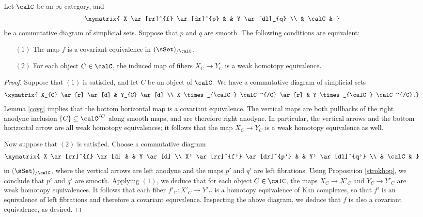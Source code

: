 \begin{proposition}\label{longwait44}
Let $\calC$ be an $\infty$-category, and
$$\xymatrix{ X \ar[rr]^{f} \ar[dr]^{p} & & Y \ar[dl]_{q} \\
& \calC & }$$ be a commutative diagram of simplicial sets. Suppose that
$p$ and $q$ are smooth. The following conditions are equivalent:
\begin{itemize}
\item[$(1)$] The map $f$ is a covariant equivalence in $(\sSet)_{/\calC}$.
\item[$(2)$] For each object $C \in \calC$, the induced map of fibers
$X_{C} \rightarrow Y_{C}$ is a weak homotopy equivalence.
\end{itemize} 
\end{proposition}

\begin{proof}
Suppose that $(1)$ is satisfied, and let $C$ be an object of $\calC$.
We have a commutative diagram of simplicial sets
$$ \xymatrix{ X_{C} \ar[r] \ar[d] & Y_{C} \ar[d] \\
X \times_{\calC} \calC^{/C} \ar[r] & Y \times_{\calC} \calC^{/C}.} $$
Lemma \ref{covg} implies that the bottom horizontal map is a covariant equivalence. The vertical maps are both pullbacks of the right anodyne inclusion 
$ \{ C\} \subseteq \calC^{/C}$ along smooth maps, and are therefore right anodyne. In particular, the vertical arrows and the bottom horizontal arrow are all weak homotopy equivalences; it follows that the map $X_{C} \rightarrow Y_{C}$ is a weak homotopy equivalence as well.

Now suppose that $(2)$ is satisfied. Choose a commutative diagram
$$ \xymatrix{ X \ar[rr]^{f} \ar[d] & & Y \ar[d] \\
X' \ar[rr]^{f'} \ar[dr]^{p'}  & & Y' \ar[dl]^{q'} \\
& \calC & }$$
in $(\sSet)_{/\calC}$, where the vertical arrows are left anodyne and the maps
$p'$ and $q'$ are left fibrations. Using Proposition \ref{strokhop}, we conclude that
$p'$ and $q'$ are smooth. Applying $(1)$, we deduce that for each object $C \in \calC$,
the maps $X_{C} \rightarrow X'_{C}$ and $Y_{C} \rightarrow Y'_{C}$ are weak homotopy equivalences. It follows that each fiber $f'_{C}: X'_{C} \rightarrow Y'_{C}$ is a homotopy equivalence of Kan complexes, so that $f'$ is an equivalence of left fibrations and therefore
a covariant equivalence. Inspecting the above diagram, we deduce that $f$ is also a covariant equivalence, as desired.
\end{proof}

